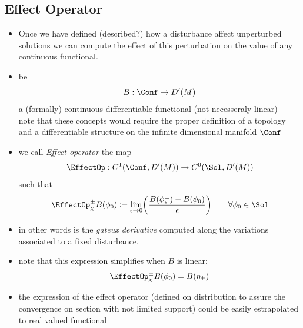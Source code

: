 \documentclass[a4paper,11pt]{scrartcl}
\begin{document}
    \subsection{Effect Operator}
    \begin{itemize}
        \item Once we have defined (described?) how a disturbance affect unperturbed solutions we can compute the effect of this perturbation on the value of any continuous functional.
        \item be
        $$B: \Conf \rightarrow D'(M)$$
        a (formally) continuous differentiable functional (not necesseraly linear)\\
        note that these concepts would require the proper definition of a topology and a differentiable structure on the infinite dimensional manifold $\Conf$
        \item we call \emph{Effect operator} the map
        $$\EffectOp : C^1(\Conf,D'(M)) \rightarrow C^0(\Sol,D'(M))$$
        such that
        $$    \EffectOp_\chi^\pm B ( \phi_0) \coloneqq \lim_{\epsilon \rightarrow 0} \biggr( \frac{B(\phi_\epsilon^\pm) - B (\phi_0)}{\epsilon} \biggr)  \qquad \forall \phi_0 \in \Sol $$
        \item in other words is the \emph{gateux derivative} computed along the variations associated to a fixed disturbance.
        \item note that this expression simplifies when $B$ is linear:
        $$ \EffectOp_\chi^\pm B ( \phi_0) =  B(\eta_\pm) $$
        \item the expression of the effect operator (defined on distribution to assure the convergence on section with not limited support)
        could be easily estrapolated to real valued  functional

    \end{itemize}
\end{document}
